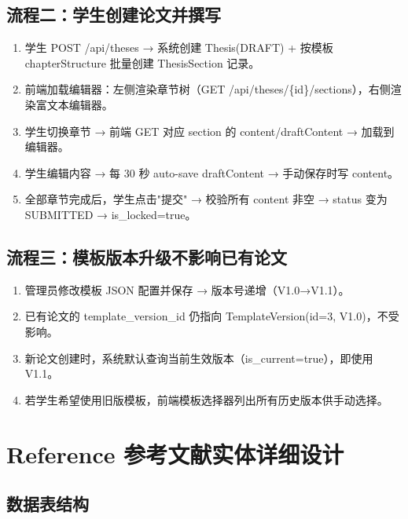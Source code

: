 \documentclass{../../softeng}
\begin{document}
\subsection{流程二：学生创建论文并撰写}

\begin{enumerate}
    \item 学生 POST /api/theses → 系统创建 Thesis(DRAFT) + 按模板 chapterStructure 批量创建 ThesisSection 记录。
    \item 前端加载编辑器：左侧渲染章节树（GET /api/theses/\{id\}/sections），右侧渲染富文本编辑器。
    \item 学生切换章节 → 前端 GET 对应 section 的 content/draftContent → 加载到编辑器。
    \item 学生编辑内容 → 每 30 秒 auto-save draftContent → 手动保存时写 content。
    \item 全部章节完成后，学生点击"提交" → 校验所有 content 非空 → status 变为 SUBMITTED → is\_locked=true。
\end{enumerate}

\subsection{流程三：模板版本升级不影响已有论文}

\begin{enumerate}
    \item 管理员修改模板 JSON 配置并保存 → 版本号递增（V1.0→V1.1）。
    \item 已有论文的 template\_version\_id 仍指向 TemplateVersion(id=3, V1.0)，不受影响。
    \item 新论文创建时，系统默认查询当前生效版本（is\_current=true），即使用 V1.1。
    \item 若学生希望使用旧版模板，前端模板选择器列出所有历史版本供手动选择。
\end{enumerate}

\section{Reference 参考文献实体详细设计}

\subsection{数据表结构}
\end{document}
